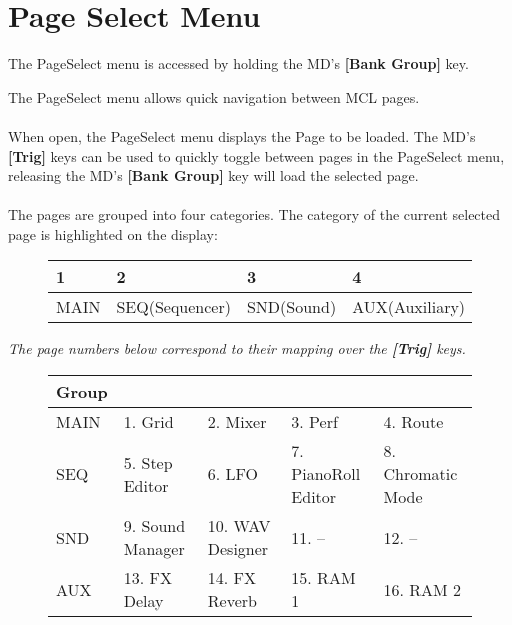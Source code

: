 \chapter{Page Select Menu}
The PageSelect menu is accessed by holding the MD's \textbf{[Bank Group]} key.

The PageSelect menu allows quick navigation between MCL pages.
\\
\\
When open, the PageSelect menu displays the Page to be loaded. The MD's \textbf{[Trig]} keys can be used to quickly toggle between pages in the PageSelect menu, releasing the MD's \textbf{[Bank Group]} key will load the selected page.
\\
\\
The pages are grouped into four categories. The category of the current selected page is highlighted on the display:

\begin{figure}[h]
    \begin{tabular}{|l|l|l|l|}
    \hline
    \rowcolor[HTML]{C0C0C0} 
    1    & 2              & 3          & 4              \\ \hline
    MAIN & SEQ(Sequencer) & SND(Sound) & AUX(Auxiliary) \\ \hline
    \end{tabular}
\end{figure}
\textit{ The page numbers below correspond to their mapping over the \textbf{[Trig]} keys. }


\begin{figure}[h]
    \begin{tabular}{|l|l|l|l|l|}
    \hline
    \rowcolor[HTML]{C0C0C0} 
    {\color[HTML]{000000} Group} & \multicolumn{4}{l|}{\cellcolor[HTML]{C0C0C0}{\color[HTML]{000000} Pages}}      \\ \hline
    MAIN                              & 1. Grid            & 2. Mixer         & 3. Perf           & 4. Route            \\ \hline
    SEQ                               & 5. Step Editor & 6. LFO & 7. PianoRoll Editor & 8. Chromatic Mode \\ \hline
    SND                               & 9. Sound Manager   & 10. WAV Designer & 11. --       & 12. --      \\ \hline
    AUX                               & 13. FX Delay       & 14. FX Reverb    & 15. RAM 1          & 16. RAM 2         \\ \hline
    \end{tabular}
\end{figure}








